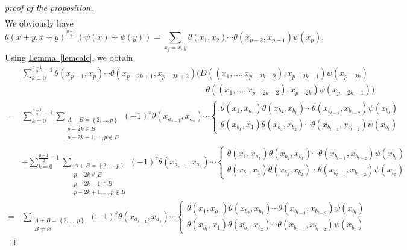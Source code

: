 \documentclass[11pt, twoside]{article}
\DeclareMathOperator{\p}{\mathcal{P}}
\begin{document}
\begin{proof}[proof of the proposition]
\begin{align*}
\end{align*} We obviously have $$\theta(x+y,x+y)^{\frac{p-1}{2}}(\psi(x)+\psi(y))= \sum\limits_{x_j=x,y}\theta(x_1,x_2)\cdots\theta(x_{p-2},x_{p-1})\psi(x_p).  $$
Using \hyperref[lemcalc]{Lemma~\ref*{lemcalc}}, we obtain  \begin{align*}
    &\sum\limits_{k=0}^{\frac{p-1}{2}-1}\theta(x_{p-1},x_p)\cdots\theta(x_{p-2k+1},x_{p-2k+2})(D((x_1,\ldots,x_{p-2k-2}),x_{p-2k-1})\psi(x_{p-2k}) \\ & \,\,\,\,\,\,\,\,\,\,\,\,\,\,\,\,\,\,\,\,\,\,\,\,\,\,\,\,\,\,\,\,\,\,\,\,\,\,\,\,\,\,\,\,\,\,\,\,\,\,\,\,\,\,\,\,\,\,\,\,\,\,\,\,\,\,\,\,\,\,\,\,\,\,\,\,\,\,\,\,\,\,\,\,\,\,\,\,\,\,\,\,\,\,\,\,\,\,\,\,\,\,\,\,\,\,\,\,\,\,\,\,\,\,\,\,\,\,\,\,\,\,\,\,-\theta((x_1,\ldots,x_{p-2k-2}),x_{p-2k})\psi(x_{p-2k-1})) \\ =&\sum\limits_{k=0}^{\frac{p-1}{2}-1}\sum_{\substack{A+B=\left\{2,\ldots,p\right\}\\p-2k\in B\\ p-2k+1,\ldots,p\notin B}}(-1)^s\theta(x_{a_{s-1}},x_{a_s})\cdots \left\{\begin{matrix}
\theta (x_1,x_{a_1})\theta(x_{b_2},x_{b_1})\cdots\theta(x_{b_{t-1}},x_{b_{t-2}})\psi(x_{b_t}) \\\theta (x_{b_1},x_1)\theta(x_{b_3},x_{b_2})\cdots\theta(x_{b_{t-1}},x_{b_{t-2}})\psi(x_{b_t})
\end{matrix}\right. \\ &+ \sum\limits_{k=0}^{\frac{p-1}{2}-1}\sum_{\substack{A+B=\left\{2,\ldots,p\right\}\\p-2k\notin B\\p-2k-1\in B \\ p-2k+1,\ldots,p\notin B}}(-1)^s\theta(x_{a_{s-1}},x_{a_s})\cdots \left\{\begin{matrix}
\theta (x_1,x_{a_1})\theta(x_{b_2},x_{b_1})\cdots\theta(x_{b_{t-1}},x_{b_{t-2}})\psi(x_{b_t}) \\\theta (x_{b_1},x_1)\theta(x_{b_3},x_{b_2})\cdots\theta(x_{b_{t-1}},x_{b_{t-2}})\psi(x_{b_t})
\end{matrix}\right.\\ =&  \sum_{\substack{A+B=\left\{2,\ldots,p\right\}\\B\neq \varnothing}}(-1)^s\theta(x_{a_{s-1}},x_{a_s})\cdots \left\{\begin{matrix}
\theta (x_1,x_{a_1})\theta(x_{b_2},x_{b_1})\cdots\theta(x_{b_{t-1}},x_{b_{t-2}})\psi(x_{b_t}) \\\theta (x_{b_1},x_1)\theta(x_{b_3},x_{b_2})\cdots\theta(x_{b_{t-1}},x_{b_{t-2}})\psi(x_{b_t})

\end{matrix}
\end{align*}
\end{proof}
\end{document}
